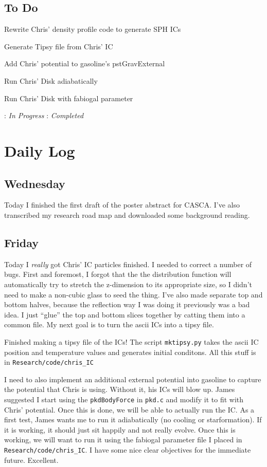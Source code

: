 \documentclass[11pt,letterpaper]{article}
\begin{document}
\pagebreak
\subsection*{To Do}
\begin{bullets}
\item[\checkmark] Rewrite Chris' density profile code to generate SPH ICs
\item[\checkmark] Generate Tipsy file from Chris' IC
\item Add Chris' potential to gasoline's pstGravExternal
\item Run Chris' Disk adiabatically
\item Run Chris' Disk with fabiogal parameter
\end{bullets}

\textleaf : \textit{In Progress} \qquad \checkmark : \textit{Completed}

\section*{Daily Log}
\subsection*{Wednesday}
Today I finished the first draft of the poster abstract for CASCA.  I've also 
transcribed my research road map and downloaded some background reading.
\subsection*{Friday}
Today I \textit{really} got Chris' IC particles finished.  I needed to correct
a number of bugs.  First and foremost, I forgot that the the distribution 
function will automatically try to stretch the z-dimension to its appropriate
size, so I didn't need to make a non-cubic glass to seed the thing.  I've
also made separate top and bottom halves, because the reflection way I was
doing it previously was a bad idea.  I just ``glue'' the top and bottom slices
together by catting them into a common file.  My next goal is to turn the 
ascii ICs into a tipsy file.

Finished making a tipsy file of the ICs!  The script \verb!mktipsy.py! takes
the ascii IC position and temperature values and generates initial 
conditons.  All this stuff is in \verb!Research/code/chris_IC!

I need to also implement an additional external potential into gasoline to 
capture the potential that Chris is using.  Without it, his ICs will blow up.
James suggested I start using the \verb!pkdBodyForce! in \verb!pkd.c! and 
modify it to fit with Chris' potential.  Once this is done, we will be able to
actually run the IC.  As a first test, James wants me to run it adiabatically
(no cooling or starformation).  If it is working, it should just sit happily 
and not really evolve.  Once this is working, we will want to run it using the
fabiogal parameter file I placed in \verb!Research/code/chris_IC!.  I have some
nice clear objectives for the immediate future.  Excellent.
\end{document}
